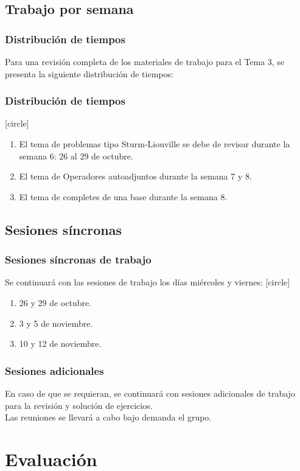 \documentclass[12pt]{beamer}
\begin{document}
\subsection{Trabajo por semana}

\begin{frame}
\frametitle{Distribución de tiempos}
Para una revisión completa de los materiales de trabajo para el Tema 3, se presenta la siguiente distribución de tiempos:
\end{frame}
\begin{frame}
\frametitle{Distribución de tiempos}
[circle]
\begin{enumerate}
\item El tema de problemas tipo Sturm-Liouville se debe de revisar durante la semana 6: 26 al 29 de octubre.
\item  El tema de Operadores autoadjuntos durante la semana 7 y 8.
\item El tema de completes de una base durante la semana 8.
\end{enumerate}
\end{frame}

\subsection{Sesiones síncronas}

\begin{frame}
\frametitle{Sesiones síncronas de trabajo}
Se continuará con las sesiones de trabajo los días miércoles y viernes:
[circle]
\begin{enumerate}[<+->]
\item 26 y 29 de octubre.
\item 3 y 5 de noviembre.
\item 10 y 12 de noviembre.
\end{enumerate}
\end{frame}
\begin{frame}
\frametitle{Sesiones adicionales}
En caso de que se requieran, se continuará con sesiones adicionales de trabajo para la revisión y solución de ejercicios.
\\
\bigskip
\pause
Las reuniones se llevará a cabo bajo demanda el grupo.
\end{frame}

\section{Evaluación}
\end{document}
